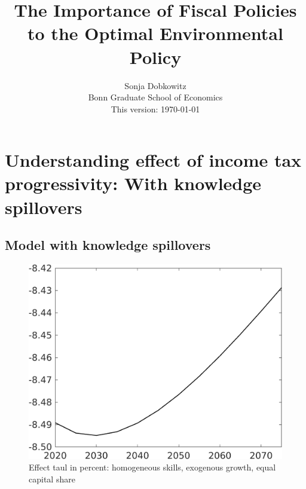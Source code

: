 \documentclass[12pt]{article}
\title{The Importance of Fiscal Policies to the Optimal Environmental Policy}
\date{Sonja Dobkowitz\\ Bonn Graduate School of Economics\\ %
	\vspace{1mm}
	This version: \today }
\begin{document}
\section{Understanding effect of income tax progressivity: With knowledge spillovers}

\clearpage
\subsection{Model with knowledge spillovers}
\begin{figure}[h!!]
	\centering
	\caption{Effect taul in percent: homogeneous skills, exogenous growth, equal capital share}\label{fig:LF_BAU_nsk1_xgr1_equalcapShare_know}
	\begin{minipage}[]{0.32\textwidth}
		\includegraphics[width=1\textwidth]{../../codding_model/own_basedOnFried/optimalPol_010922_revision/figures/all_13Sept22/CompTaul_Equlab_LFBAUPer_Reg0_Emnet_spillover0_nsk1_xgr1_knspil0_sep1_countec0_GovRev0_etaa0.79.png}
	\end{minipage}	
	\begin{minipage}[]{0.32\textwidth}

\end{minipage}
\end{figure}
\end{document}

